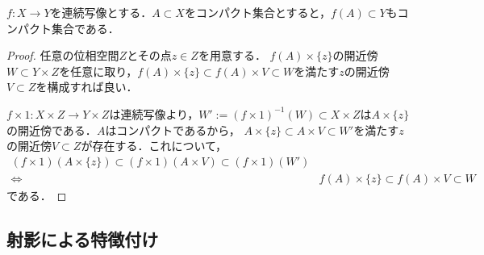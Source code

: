 \documentclass[uplatex,dvipdfmx]{jsreport}
\begin{document}
\begin{corollary}[連続写像はコンパクト性を保存する]\label{cor-image-of-compact-set-is-compact}
    $f:X\to Y$を連続写像とする．$A\subset X$をコンパクト集合とすると，$f(A)\subset Y$もコンパクト集合である．
\end{corollary}
\begin{proof}
    任意の位相空間$Z$とその点$z\in Z$を用意する．
    $f(A)\times\{z\}$の開近傍$W\subset Y\times Z$を任意に取り，$f(A)\times\{z\}\subset f(A)\times V\subset W$を満たす$z$の開近傍$V\subset Z$を構成すれば良い．

    $f\times 1:X\times Z\to Y\times Z$は連続写像より，$W':=(f\times 1)^{-1}(W)\subset X\times Z$は$A\times\{z\}$の開近傍である．$A$はコンパクトであるから，
    $A\times\{z\}\subset A\times V\subset W'$を満たす$z$の開近傍$V\subset Z$が存在する．これについて，
    \begin{align*}
        (f\times 1)(A\times\{z\})\subset(f\times 1)(A\times V)\subset(f\times 1)(W')\\
        \Leftrightarrow\quad&f(A)\times\{z\}\subset f(A)\times V\subset W
    \end{align*}
    である．
\end{proof}

\subsection{射影による特徴付け}
\end{document}
